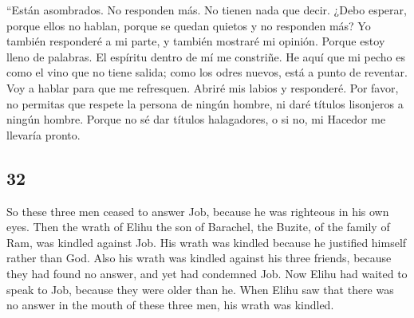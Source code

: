 \begin{paracol}{2}
 ``Están asombrados. No responden más. No tienen nada que
decir.  ¿Debo esperar, porque ellos no hablan, porque se
quedan quietos y no responden más?  Yo también responderé
a mi parte, y también mostraré mi opinión.  Porque estoy
lleno de palabras. El espíritu dentro de mí me constriñe.
 He aquí que mi pecho es como el vino que no tiene
salida; como los odres nuevos, está a punto de reventar. 
Voy a hablar para que me refresquen. Abriré mis labios y responderé.
 Por favor, no permitas que respete la persona de ningún
hombre, ni daré títulos lisonjeros a ningún hombre. 
Porque no sé dar títulos halagadores, o si no, mi Hacedor me llevaría
pronto.

\switchcolumn
\begin{otherlanguage}{english}

\hypertarget{section-63}{%
\section{32}\label{section-63}}

 So these three men ceased to answer Job, because he was
righteous in his own eyes.  Then the wrath of Elihu the
son of Barachel, the Buzite, of the family of Ram, was kindled against
Job. His wrath was kindled because he justified himself rather than God.
 Also his wrath was kindled against his three friends,
because they had found no answer, and yet had condemned Job.
 Now Elihu had waited to speak to Job, because they were
older than he.  When Elihu saw that there was no answer in
the mouth of these three men, his wrath was kindled.


\end{otherlanguage}
\end{paracol}
